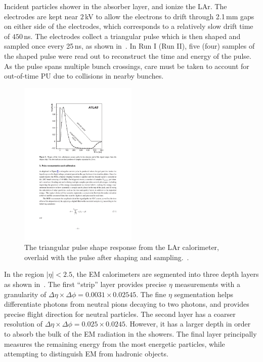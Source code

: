 Incident particles shower in the absorber layer, and ionize the LAr. The electrodes are kept near $2$\,kV to allow the electrons to drift through 2.1\,mm gaps on either side of the electrodes, which corresponds to a relatively slow drift time of $450$\,ns. The electrodes collect a triangular pulse which is then shaped and sampled once every 25\,ns, as shown in~\Fig{\ref{fig:lar_pulse}}. In Run I (Run II), five (four) samples of the shaped pulse were read out to reconstruct the time and energy of the pulse. As the pulse spans multiple bunch crossings, care must be taken to account for out-of-time PU due to collisions in nearby bunches.

\begin{figure}
\begin{center}
\includegraphics[width=0.5\textwidth]{figures/ATLAS/lar_pulse}
\caption[Liquid Argon calorimeter signal pulse]{The triangular pulse shape response from the LAr calorimeter, overlaid with the pulse after shaping and sampling.~\cite{ATLAS}.}
\label{fig:lar_pulse}
\end{center}
\end{figure}

In the region $|\eta|<2.5$, the EM calorimeters are segmented into three depth layers as shown in~\Fig{\ref{fig:lar_cross}}. The first ``strip'' layer provides precise $\eta$ measurements with a granularity of $\Delta\eta\times\Delta\phi=0.0031\times0.02545$. The fine $\eta$ segmentation helps differentiate photons from neutral pions decaying to two photons, and provides precise flight direction for neutral particles. The second layer has a coarser resolution of $\Delta\eta\times\Delta\phi=0.025\times0.0245$. However, it has a larger depth in order to absorb the bulk of the EM radiation in the showers. The final layer principally measures the remaining energy from the most energetic particles, while attempting to distinguish EM from hadronic objects. 

